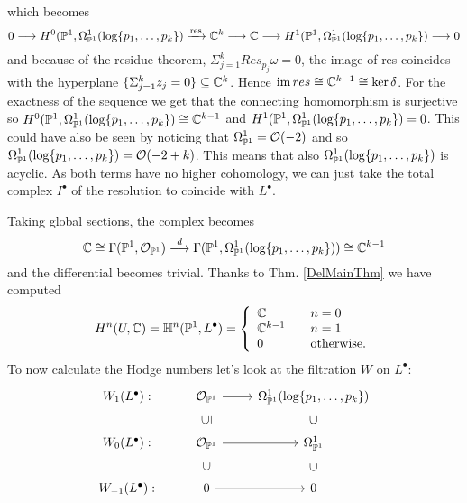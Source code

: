 \documentclass[../main.tex]{subfiles}
\begin{document}
\begin{es}
which becomes 
\[
0 \longrightarrow H^0(\mathbb{P}^1,\Omega^1_{\mathbb{P}^1}(\log\{p_1,\ldots,p_k\}) \xrightarrow{\text{res}} \mathbb{C}^k
    \longrightarrow \mathbb{C} \longrightarrow H^1(\mathbb{P}^1,\Omega^1_{\mathbb{P}^1}(\log\{p_1,\ldots,p_k\}) \longrightarrow 0
\]
and because of the residue theorem, $\Sigma_{j=1}^kRes_{p_j}\omega =0$, the image of res coincides with the hyperplane $\{\Sigma_{j=1}^k z_j = 0 \} \subseteq \mathbb{C}^k$. Hence $\operatorname{im} res \cong \mathbb{C}^{k-1} \cong \ker \delta$. For the exactness of the sequence we get that the connecting homomorphism is surjective so $H^0(\mathbb{P}^1,\Omega^1_{\mathbb{P}^1}(\log\{p_1,\ldots,p_k\}) \cong \mathbb{C}^{k-1}$ and $H^1(\mathbb{P}^1,\Omega^1_{\mathbb{P}^1}(\log\{p_1,\ldots,p_k\}) = 0$.
This could have also be seen by noticing that $\Omega^1_{\mathbb{P}^1} = \mathcal{O}(-2)$ and so $\Omega^1_{\mathbb{P}^1}(\log\{p_1,\ldots,p_k\}) = \mathcal{O}(-2+k)$.
This means that also $\Omega^1_{\mathbb{P}^1}(\log\{p_1,\ldots,p_k\})$ is acyclic.
As both terms have no higher cohomology, we can just take the total complex $I^\bullet$ of the resolution to coincide with $L^\bullet$.

Taking global sections, the complex becomes
\[\mathbb{C}\cong\Gamma(\mathbb{P}^1,\mathcal{O}_{\mathbb{P}^1})\stackrel{d}{\longrightarrow}\Gamma(\mathbb{P}^1,\Omega^1_{\mathbb{P}^1}(\log\{p_1,\ldots,p_k\}))
 \cong \mathbb{C}^{k-1}\]
and the differential becomes trivial.
Thanks to Thm. \ref{DelMainThm}  we have computed 
\begin{eqnarray*}
H^n(U,\mathbb{C}) = \mathbb{H}^n(\mathbb{P}^1,L^\bullet)
=  \left\{\begin{array}{ll} \mathbb{C} &\quad n=0\\ 
\mathbb{C}^{k-1} &\quad n=1\\
0&\quad\hbox{otherwise.}\end{array}\right.\\
\end{eqnarray*}
To now calculate the Hodge numbers let's look at the filtration $W$ on $L^\bullet$:
\[
\begin{tikzcd} %
W_{1}(L^\bullet) : & \calO_{\PP^1}\arrow[r] & \Omega^1_{\PP^1}(\log\{p_1,\ldots,p_k\})\\
W_{0}(L^\bullet) : & \calO_{\PP^1}\arrow[r] \arrow[u, phantom, sloped, "\subseteq"] & \Omega^1_{\PP^1} \arrow[u, phantom, sloped, "\subset"]\\
W_{-1}(L^\bullet) : & 0\arrow[r] \arrow[u, phantom, sloped, "\subset"] & 0 \arrow[u, phantom, sloped, "\subset"]\\
\end{tikzcd}
\]




\end{es}
\end{document}
